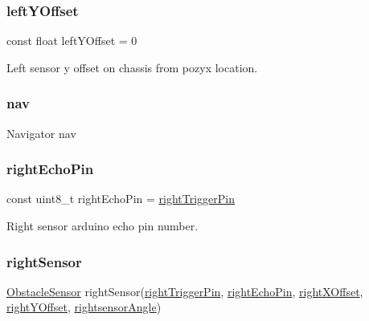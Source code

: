 \subsubsection{\texorpdfstring{left\+Y\+Offset}{leftYOffset}}
{\footnotesize\ttfamily const float left\+Y\+Offset = 0}



Left sensor y offset on chassis from pozyx location. 

\mbox{\label{bot_main_8ino_a4d757d2a3d2bcf4b98f6f4a72d7df7de}} 
\subsubsection{\texorpdfstring{nav}{nav}}
{\footnotesize\ttfamily Navigator nav}

\mbox{\label{bot_main_8ino_a513a215c9894c01e37f389b072c5cec4}} 
\subsubsection{\texorpdfstring{right\+Echo\+Pin}{rightEchoPin}}
{\footnotesize\ttfamily const uint8\+\_\+t right\+Echo\+Pin = \mbox{\hyperlink{bot_main_8ino_a906054d9d48970211789ac841d331898}{right\+Trigger\+Pin}}}



Right sensor arduino echo pin number. 

\mbox{\label{bot_main_8ino_a4b08258caa24173f4153413d596aea69}} 
\subsubsection{\texorpdfstring{right\+Sensor}{rightSensor}}
{\footnotesize\ttfamily \mbox{\hyperlink{class_obstacle_sensor}{Obstacle\+Sensor}} right\+Sensor(\mbox{\hyperlink{bot_main_8ino_a906054d9d48970211789ac841d331898}{right\+Trigger\+Pin}}, \mbox{\hyperlink{bot_main_8ino_a513a215c9894c01e37f389b072c5cec4}{right\+Echo\+Pin}}, \mbox{\hyperlink{bot_main_8ino_ac932cddb5bc68094c96d0034c92faef9}{right\+X\+Offset}}, \mbox{\hyperlink{bot_main_8ino_a07903b96b48e8e456debd9cc43c7af05}{right\+Y\+Offset}}, \mbox{\hyperlink{bot_main_8ino_a83724535498f068d5b44150a2bc4fcf8}{rightsensor\+Angle}})}



